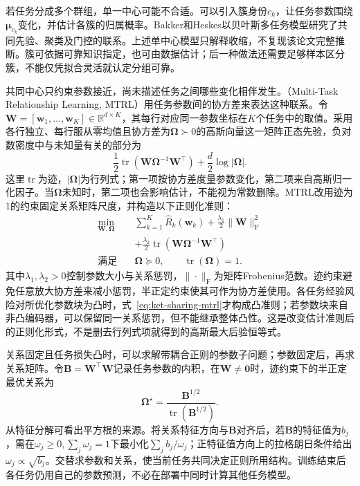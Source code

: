 若任务分成多个群组，单一中心可能不合适。可以引入簇身份$c_k$，让任务参数围绕$\bm\mu_{c_k}$变化，并估计各簇的归属概率。Bakker和Heskes以贝叶斯多任务模型研究了共同先验、聚类及门控的联系。上述单中心模型只解释收缩，不复现该论文完整推断。簇可依据可靠知识指定，也可由数据估计；后一种做法还需要足够样本区分簇，不能仅凭拟合灵活就认定分组可靠。

共同中心只约束参数接近，尚未描述任务之间哪些变化相伴发生。（Multi-Task Relationship Learning, MTRL）用任务参数间的协方差来表达这种联系。令$\bm W=[\bm w_1,\ldots,\bm w_K]\in\mathbb R^{d\times K}$，其每行对应同一参数坐标在$K$个任务中的取值。采用各行独立、每行服从零均值且协方差为$\bm\Omega\succ0$的高斯向量这一矩阵正态先验，负对数密度中与未知量有关的部分为
\begin{equation}
  \frac12\operatorname{tr}
    (\bm W\bm\Omega^{-1}\bm W^{\top})
  +\frac d2\log|\bm\Omega|.
  \label{eq:ket-sharing-matrix-prior}
\end{equation}
这里$\operatorname{tr}$为迹，$|\bm\Omega|$为行列式；第一项按协方差度量参数变化，第二项来自高斯归一化因子。当$\bm\Omega$未知时，第二项也会影响估计，不能视为常数删除。MTRL改用迹为1的约束固定关系矩阵尺度，并构造以下正则化准则：
\begin{align}
  \min_{\bm W,\bm\Omega}\quad&
  \sum_{k=1}^{K}\hat R_k(\bm w_k)
  +\frac{\lambda_1}{2}\|\bm W\|_{\mathrm F}^2
  \nonumber\\
  &+\frac{\lambda_2}{2}
    \operatorname{tr}(\bm W\bm\Omega^{-1}\bm W^{\top})
  \nonumber\\
  \text{满足}\quad&
  \bm\Omega\succeq0,
  \qquad \operatorname{tr}(\bm\Omega)=1.
  \label{eq:ket-sharing-mtrl}
\end{align}
其中$\lambda_1,\lambda_2>0$控制参数大小与关系惩罚，$\|\cdot\|_{\mathrm F}$为矩阵Frobenius范数。迹约束避免任意放大协方差来减小惩罚，半正定约束使其可作为协方差使用。各任务经验风险对所优化参数块为凸时，式~\eqref{eq:ket-sharing-mtrl}才构成凸准则；若参数块来自非凸编码器，可以保留同一关系惩罚，但不能继承整体凸性。这是改变估计准则后的正则化形式，不是删去行列式项就得到的高斯最大后验恒等式。

关系固定且任务损失凸时，可以求解带耦合正则的参数子问题；参数固定后，再求关系矩阵。令$\bm B=\bm W^{\top}\bm W$记录任务参数的内积，在$\bm W\ne\bm0$时，迹约束下的半正定最优关系为
\begin{equation}
  \bm\Omega^\star
  =\frac{\bm B^{1/2}}
    {\operatorname{tr}(\bm B^{1/2})}.
  \label{eq:ket-sharing-mtrl-omega}
\end{equation}
从特征分解可看出平方根的来源。将关系特征方向与$\bm B$对齐后，若$\bm B$的特征值为$b_j$，需在$\omega_j\geq0,\sum_j\omega_j=1$下最小化$\sum_jb_j/\omega_j$；正特征值方向上的拉格朗日条件给出$\omega_j\propto\sqrt{b_j}$。交替求参数和关系，使当前任务共同决定正则所用结构。训练结束后各任务仍用自己的参数预测，不必在部署中同时计算其他任务模型。

